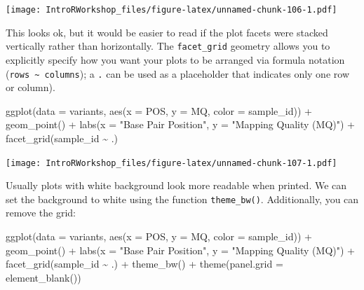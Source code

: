 \documentclass[
]{book}
\newenvironment{Shaded}{\begin{snugshade}}{\end{snugshade}}
\newcommand{\AttributeTok}[1]{\textcolor[rgb]{0.77,0.63,0.00}{#1}}
\newcommand{\FunctionTok}[1]{\textcolor[rgb]{0.00,0.00,0.00}{#1}}
\newcommand{\NormalTok}[1]{#1}
\newcommand{\SpecialCharTok}[1]{\textcolor[rgb]{0.00,0.00,0.00}{#1}}
\newcommand{\StringTok}[1]{\textcolor[rgb]{0.31,0.60,0.02}{#1}}
\begin{document}
\texttt{[image: IntroRWorkshop\_files/figure-latex/unnamed-chunk-106-1.pdf]}

This looks ok, but it would be easier to read if the plot facets were stacked vertically rather than horizontally. The \texttt{facet\_grid} geometry allows you to explicitly specify how you want your plots to be arranged via formula notation (\texttt{rows\ \textasciitilde{}\ columns}); a \texttt{.} can be used as a placeholder that indicates only one row or column).

\begin{Shaded}
\begin{Highlighting}[]
\FunctionTok{ggplot}\NormalTok{(}\AttributeTok{data =}\NormalTok{ variants, }\FunctionTok{aes}\NormalTok{(}\AttributeTok{x =}\NormalTok{ POS, }\AttributeTok{y =}\NormalTok{ MQ, }\AttributeTok{color =}\NormalTok{ sample\_id)) }\SpecialCharTok{+}
 \FunctionTok{geom\_point}\NormalTok{() }\SpecialCharTok{+}
 \FunctionTok{labs}\NormalTok{(}\AttributeTok{x =} \StringTok{"Base Pair Position"}\NormalTok{,}
      \AttributeTok{y =} \StringTok{"Mapping Quality (MQ)"}\NormalTok{) }\SpecialCharTok{+}
 \FunctionTok{facet\_grid}\NormalTok{(sample\_id }\SpecialCharTok{\textasciitilde{}}\NormalTok{ .)}
\end{Highlighting}
\end{Shaded}

\texttt{[image: IntroRWorkshop\_files/figure-latex/unnamed-chunk-107-1.pdf]}

Usually plots with white background look more readable when printed. We can set the background to white using the function \texttt{theme\_bw()}. Additionally, you can remove the grid:

\begin{Shaded}
\begin{Highlighting}[]
\FunctionTok{ggplot}\NormalTok{(}\AttributeTok{data =}\NormalTok{ variants, }\FunctionTok{aes}\NormalTok{(}\AttributeTok{x =}\NormalTok{ POS, }\AttributeTok{y =}\NormalTok{ MQ, }\AttributeTok{color =}\NormalTok{ sample\_id)) }\SpecialCharTok{+}
  \FunctionTok{geom\_point}\NormalTok{() }\SpecialCharTok{+}
  \FunctionTok{labs}\NormalTok{(}\AttributeTok{x =} \StringTok{"Base Pair Position"}\NormalTok{,}
       \AttributeTok{y =} \StringTok{"Mapping Quality (MQ)"}\NormalTok{) }\SpecialCharTok{+}
  \FunctionTok{facet\_grid}\NormalTok{(sample\_id }\SpecialCharTok{\textasciitilde{}}\NormalTok{ .) }\SpecialCharTok{+}
  \FunctionTok{theme\_bw}\NormalTok{() }\SpecialCharTok{+}
  \FunctionTok{theme}\NormalTok{(}\AttributeTok{panel.grid =} \FunctionTok{element\_blank}\NormalTok{())}
\end{Highlighting}
\end{Shaded}
\end{document}
